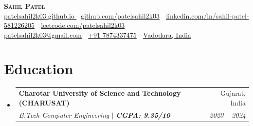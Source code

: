\documentclass[letterpaper,10pt]{article}
\makeatletter
\newcommand{\resumeSubheading}[4]{
  \vspace{-2pt}\item
    \begin{tabular*}{0.97\textwidth}[t]{l@{\extracolsep{\fill}}r}
      \textbf{#1} & #2 \\
      \textit{\small#3} & \textit{\small #4} \\
    \end{tabular*}\vspace{-7pt}
}
\newcommand{\resumeSubHeadingListStart}{\begin{itemize}[leftmargin=0.15in, label={}]}
\newcommand{\resumeSubHeadingListEnd}{\end{itemize}}
\makeatother
\begin{document}


\vspace{-5pt}

\begin{center}
    \textbf{\Huge \scshape Sahil Patel} \\ \vspace{8pt}
    \small 
    \href{https://patelsahil2k03.github.io/}{\underline{patelsahil2k03.github.io} \faExternalLink*}
    $\;$
    \href{https://github.com/patelsahil2k03}{\underline{github.com/patelsahil2k03}}
    $\;$
    \href{https://www.linkedin.com/in/sahil-patel-581226205/}
    {\underline{linkedin.com/in/sahil-patel-581226205}} 
    $\;$
    \href{https://leetcode.com/patelsahil2k03/}
    {\underline{leetcode.com/patelsahil2k03}}
    \\[4pt]
    \href{mailto:patelsahil2k03@gmail.com}
    {\underline{patelsahil2k03@gmail.com}}
    $\;$
    {\underline{+91 7874337475}}
    $\;$
    {\underline{Vadodara, India}}

\end{center}

\section{Education}
  \resumeSubHeadingListStart
  
    \resumeSubheading
      {Charotar University of Science and Technology (CHARUSAT)}{Gujarat, India}
      {B.Tech Computer Engineering $|$ \textbf{CGPA: 9.35/10}}{2020 -- 2024}

  \resumeSubHeadingListEnd

\end{document}

